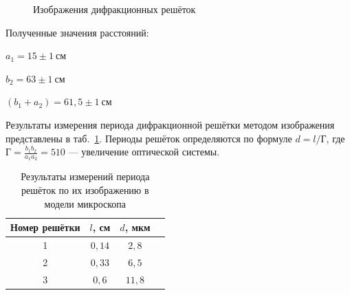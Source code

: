 \documentclass[a4paper, 12pt]{article}
\begin{document}
\begin{figure}[h!]
\begin{minipage}[h!]{0.3\linewidth}
		\end{minipage}
		\hfill
		\begin{minipage}[h!]{0.3\linewidth}
		\end{minipage}
		\hfill
		\caption{Изображения дифракционных решёток}
		\label{fig:grid_images}
\end{figure}

Полученные значения расстояний:
\begin{description}
\item{} $a_1 = 15\pm1~см$
\item{} $b_2 = 63\pm1~см$
\item{} $(b_1 + a_2) = 61,5\pm1~см$
\end{description}

Результаты измерения периода дифракционной решётки методом изображения представлены в таб.~\ref{tab2}. Периоды решёток определяются по формуле $d = l/Г$, где \newline $Г = \frac{b_1 b_2}{a_1 a_2} = 510$ --- увеличение оптической системы.

\begin{table}[h!]
\begin{center}
\begin{tabular}{|c|c|c|c|}
\hline 
Номер решётки & $l$, см & $d$, мкм \\ 
\hline 
1 & $0,14$ & $2,8$ \\ 
\hline 
2 & $0,33$ & $6,5$ \\ 
\hline 
3 & $0,6$ & $11,8$ \\ 
\hline  
\end{tabular} 
\end{center}
\caption{Результаты измерений периода решёток по их изображению в модели микроскопа}
\label{tab2}
\end{table}
\end{document}
